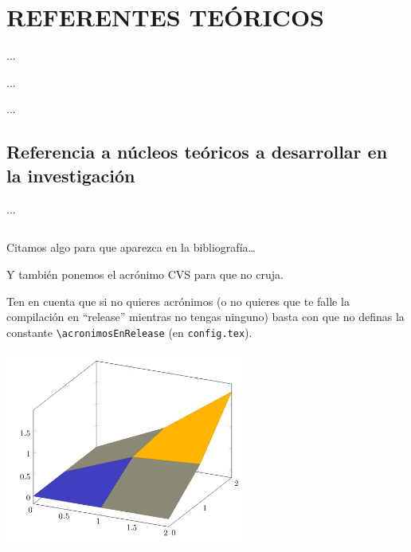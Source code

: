%
%

\chapter{REFERENTES TE\'ORICOS}

\begin{FraseCelebre}
\begin{Frase}
...
\end{Frase}
\begin{Fuente}
...
\end{Fuente}
\end{FraseCelebre}

\begin{resumen}
...
\end{resumen}


\section{Referencia a n\'ucleos te\'oricos a desarrollar en la investigaci\'on }
\label{cap1:sec:referencia}

...

\section*{\NotasBibliograficas}
\TocNotasBibliograficas

Citamos algo para que aparezca en la bibliograf\'ia\ldots
\citep{ldesc2e}

\medskip

Y tambi\'en ponemos el acr\'onimo \ac{CVS} para que no cruja.

Ten en cuenta que si no quieres acr\'onimos (o no quieres que te falle la compilaci\'on en ``release'' mientras no tengas ninguno) basta con que no definas la constante \verb+\acronimosEnRelease+ (en \texttt{config.tex}).

\begin{chart}
    \centering
    \includegraphics[width=8cm]{Imagenes/Pgfplot3d3}
    \label{cha:chart1}
    \end{chart}
    
